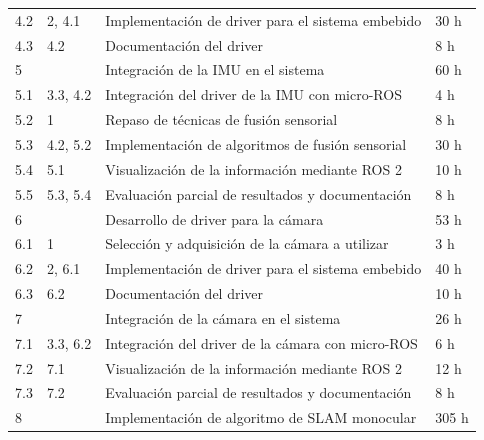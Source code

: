 \documentclass[
11pt, %
codirector, %
]{charter}
\begin{document}
\begin{table}[htpb]
\begin{tabular}{@{}llll@{}}
4.2             & 2, 4.1               & Implementación de driver para el sistema embebido  & 30 h               \\
4.3             & 4.2                  & Documentación del driver                           & 8 h                \\
5               &                      & Integración de la IMU en el sistema                & 60 h               \\
5.1             & 3.3, 4.2             & Integración del driver de la IMU con micro-ROS     & 4 h                \\
5.2             & 1                    & Repaso de técnicas de fusión sensorial             & 8 h                \\
5.3             & 4.2, 5.2             & Implementación de algoritmos de fusión sensorial   & 30 h               \\
5.4             & 5.1                  & Visualización de la información mediante ROS 2     & 10 h               \\
5.5             & 5.3, 5.4             & Evaluación parcial de resultados y documentación   & 8 h                \\
6               &                      & Desarrollo de driver para la cámara                & 53 h               \\
6.1             & 1                    & Selección y adquisición de la cámara a utilizar    & 3 h                \\
6.2             & 2, 6.1               & Implementación de driver para el sistema embebido  & 40 h               \\
6.3             & 6.2                  & Documentación del driver                           & 10 h               \\
7               &                      & Integración de la cámara en el sistema             & 26 h               \\
7.1             & 3.3, 6.2             & Integración del driver de la cámara con micro-ROS  & 6 h                \\
7.2             & 7.1                  & Visualización de la información mediante ROS 2     & 12 h               \\
7.3             & 7.2                  & Evaluación parcial de resultados y documentación   & 8 h                \\
8               &                      & Implementación de algoritmo de SLAM monocular      & 305 h              \\

\end{tabular}
\end{table}
\end{document}
